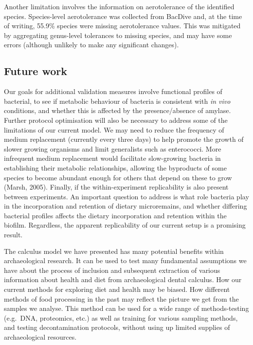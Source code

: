 \documentclass[
]{article}
\begin{document}
Another limitation involves the information on aerotolerance of the
identified species. Species-level aerotolerance was collected from
BacDive and, at the time of writing, 55.9\% species were missing
aerotolerance values. This was mitigated by aggregating genus-level
tolerances to missing species, and may have some errors (although
unlikely to make any significant changes).

\hypertarget{future-work}{%
\subsection{Future work}\label{future-work}}

Our goals for additional validation measures involve functional profiles
of bacterial, to see if metabolic behaviour of bacteria is consistent
with \emph{in vivo} conditions, and whether this is affected by the
presence/absence of amylase. Further protocol optimisation will also be
necessary to address some of the limitations of our current model. We
may need to reduce the frequency of medium replacement (currently every
three days) to help promote the growth of slower growing organisms and
limit generalists such as enterococci. More infrequent medium
replacement would facilitate slow-growing bacteria in establishing their
metabolic relationships, allowing the byproducts of some species to
become abundant enough for others that depend on these to grow (Marsh,
2005). Finally, if the within-experiment replicability is also present
between experiments. An important question to address is what role
bacteria play in the incorporation and retention of dietary
microremains, and whether differing bacterial profiles affects the
dietary incorporation and retention within the biofilm. Regardless, the
apparent replicability of our current setup is a promising result.

The calculus model we have presented has many potential benefits within
archaeological research. It can be used to test many fundamental
assumptions we have about the process of inclusion and subsequent
extraction of various information about health and diet from
archaeological dental calculus. How our current methods for exploring
diet and health may be biased. How different methods of food processing
in the past may reflect the picture we get from the samples we analyse.
This method can be used for a wide range of methods-testing (e.g.~DNA,
proteomics, etc.) as well as training for various sampling methods, and
testing decontamination protocols, without using up limited supplies of
archaeological resources.
\end{document}
